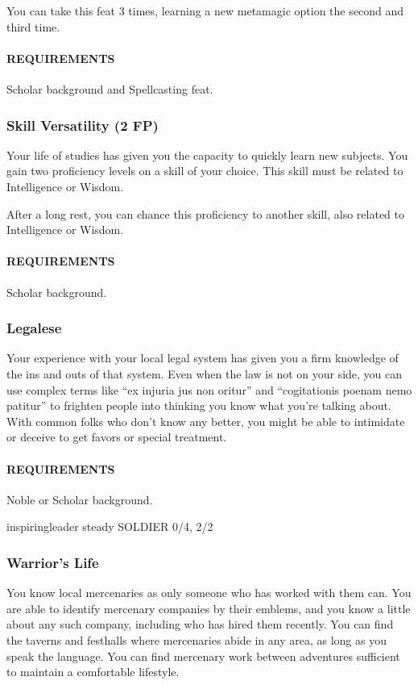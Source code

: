         You can take this feat 3 times, learning a new metamagic option the second and third time.
        \paragraph{REQUIREMENTS} Scholar background and Spellcasting feat.

    \subsubsection{Skill Versatility (2 FP)} \label{feat::skillversatility}
        Your life of studies has given you the capacity to quickly learn new subjects.
        You gain two proficiency levels on a skill of your choice.
        This skill must be related to Intelligence or Wisdom.

        After a long rest, you can chance this proficiency to another skill, also related to Intelligence or Wisdom.
        \paragraph{REQUIREMENTS} Scholar background.

    \subsubsection{Legalese} \label{feat::legalese}
        Your experience with your local legal system has given you a firm knowledge of the ins and outs of that system.
        Even when the law is not on your side, you can use complex terms like ``ex injuria jus non oritur'' and ``cogitationis poenam nemo patitur'' to frighten people into thinking you know what you're talking about.
        With common folks who don't know any better, you might be able to intimidate or deceive to get favors or special treatment.
        \paragraph{REQUIREMENTS} Noble or Scholar background.

inspiringleader steady
SOLDIER 0/4, 2/2
    \subsubsection{Warrior's Life} \label{feat::warriorslife}
        You know local mercenaries as only someone who has worked with them can.
        You are able to identify mercenary companies by their emblems, and you know a little about any such company, including who has hired them recently.
        You can find the taverns and festhalls where mercenaries abide in any area, as long as you speak the language.
        You can find mercenary work between adventures sufficient to maintain a comfortable lifestyle.
